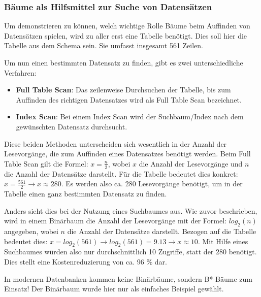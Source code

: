         \subsubsection{B\"aume als Hilfsmittel zur Suche von Datens\"atzen}
          Um demonstrieren zu k\"onnen, welch wichtige Rolle B\"aume beim
          Auffinden von Datens\"atzen spielen, wird zu aller erst eine Tabelle
          ben\"otigt. Dies soll hier die Tabelle  aus dem
          Schema  sein. Sie umfasst insgesamt 561 Zeilen.

          Um nun einen bestimmten Datensatz zu finden, gibt es zwei
          unterschiedliche Verfahren:
          \begin{itemize}
            \item \textbf{Full Table Scan}: Das zeilenweise Durchsuchen der
            Tabelle, bis zum Auffinden des richtigen Datensatzes wird als Full
            Table Scan bezeichnet.
            \item \textbf{Index Scan}: Bei einem Index Scan wird der
            Suchbaum/Index nach dem gew\"unschten Datensatz durchsucht.
          \end{itemize}
          Diese beiden Methoden unterscheiden sich wesentlich in der Anzahl der
          Lesevorg\"ange, die zum Auffinden eines Datensatzes ben\"otigt werden.
          Beim Full Table Scan gilt die Formel: $x = \frac{n}{2}$, wobei $x$ die
          Anzahl der Lesevorg\"ange und $n$ die Anzahl der Datens\"atze darstellt.
          F\"ur die Tabelle  bedeutet dies konkret: $x =
          \frac{561}{2} \rightarrow x \approx 280$. Es werden also ca. 280
          Lesevorg\"ange ben\"otigt, um in der Tabelle  einen
          ganz bestimmten Datensatz zu finden.

          Anders sieht dies bei der Nutzung eines Suchbaumes aus. Wie zuvor
          beschrieben, wird in einem Bin\"arbaum die Anzahl der Lesevorg\"ange
          mit der Formel: $log_2(n)$ angegeben, wobei $n$ die Anzahl der
          Datens\"atze darstellt. Bezogen auf die Tabelle 
          bedeutet dies: $x = log_2(561) \rightarrow log_2(561) = 9.13
          \rightarrow x \approx 10$. Mit Hilfe eines Suchbaumes w\"urden also
          nur durchschnittlich 10 Zugriffe, statt der 280 ben\"otigt. Dies
          stellt eine Kostenreduzierung von ca. 96 \% dar.
          \begin{merke}
            In modernen Datenbanken kommen keine Bin\"arb\"aume, sondern
            B*-B\"aume zum Einsatz! Der Bin\"arbaum wurde hier nur als einfaches
            Beispiel gew\"ahlt.
          \end{merke}
